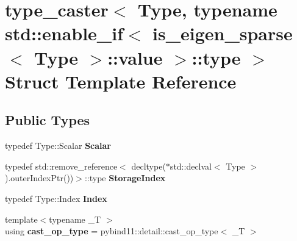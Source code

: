 \hypertarget{structtype__caster_3_01_type_00_01typename_01std_1_1enable__if_3_01is__eigen__sparse_3_01_type_01_4_1_1value_01_4_1_1type_01_4}{}\section{type\+\_\+caster$<$ Type, typename std\+:\+:enable\+\_\+if$<$ is\+\_\+eigen\+\_\+sparse$<$ Type $>$\+:\+:value $>$\+:\+:type $>$ Struct Template Reference}
\label{structtype__caster_3_01_type_00_01typename_01std_1_1enable__if_3_01is__eigen__sparse_3_01_type_01_4_1_1value_01_4_1_1type_01_4}
\subsection*{Public Types}
\begin{DoxyCompactItemize}
\item 
typedef Type\+::\+Scalar {\bfseries Scalar}\hypertarget{structtype__caster_3_01_type_00_01typename_01std_1_1enable__if_3_01is__eigen__sparse_3_01_type_01_4_1_1value_01_4_1_1type_01_4_acd844030c46363c70e9d9b7663181a4c}{}\label{structtype__caster_3_01_type_00_01typename_01std_1_1enable__if_3_01is__eigen__sparse_3_01_type_01_4_1_1value_01_4_1_1type_01_4_acd844030c46363c70e9d9b7663181a4c}

\item 
typedef std\+::remove\+\_\+reference$<$ decltype($\ast$std\+::declval$<$ Type $>$).outer\+Index\+Ptr())$>$\+::type {\bfseries Storage\+Index}\hypertarget{structtype__caster_3_01_type_00_01typename_01std_1_1enable__if_3_01is__eigen__sparse_3_01_type_01_4_1_1value_01_4_1_1type_01_4_ad5c6216d7c132c383166fe17081f8ad0}{}\label{structtype__caster_3_01_type_00_01typename_01std_1_1enable__if_3_01is__eigen__sparse_3_01_type_01_4_1_1value_01_4_1_1type_01_4_ad5c6216d7c132c383166fe17081f8ad0}

\item 
typedef Type\+::\+Index {\bfseries Index}\hypertarget{structtype__caster_3_01_type_00_01typename_01std_1_1enable__if_3_01is__eigen__sparse_3_01_type_01_4_1_1value_01_4_1_1type_01_4_a3902ea2bde041d740605930d677ee2a3}{}\label{structtype__caster_3_01_type_00_01typename_01std_1_1enable__if_3_01is__eigen__sparse_3_01_type_01_4_1_1value_01_4_1_1type_01_4_a3902ea2bde041d740605930d677ee2a3}

\item 
{\footnotesize template$<$typename \+\_\+T $>$ }\\using {\bfseries cast\+\_\+op\+\_\+type} = pybind11\+::detail\+::cast\+\_\+op\+\_\+type$<$ \+\_\+T $>$\hypertarget{structtype__caster_3_01_type_00_01typename_01std_1_1enable__if_3_01is__eigen__sparse_3_01_type_01_4_1_1value_01_4_1_1type_01_4_a8dbbf8555ac65e876530684a1a28238b}{}\label{structtype__caster_3_01_type_00_01typename_01std_1_1enable__if_3_01is__eigen__sparse_3_01_type_01_4_1_1value_01_4_1_1type_01_4_a8dbbf8555ac65e876530684a1a28238b}

\end{DoxyCompactItemize}
